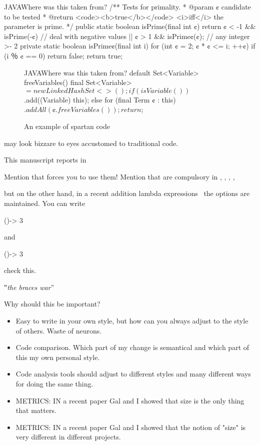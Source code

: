 \begin{Code}{JAVA}{Where was this taken from?}
/** Tests for primality.
  * @param ¢ candidate to be tested
  * @return <code><b>true</b></code> <i>iff</i> the parameter is prime. */
public static boolean isPrime(final int ¢) {
  return ¢ < -1 && isPrime(-¢) // deal with negative values
      || ¢ > 1 && isPrime¢(¢); // any integer >- 2
}
private static boolean isPrime¢(final int i) {
  for (int ¢ = 2; ¢ * ¢ <= i; ++¢)
    if (i ％ ¢ == 0)
      return false;
  return true;
}
\end{Code}
\begin{figure}[h]
  \begin{Code}{JAVA}{Where was this taken from?}
default Set<Variable> freeVariables() {
    final Set<Variable> $ = new LinkedHashSet<>();
    if (isVariable())
      $.add((Variable) this);
    else
      for (final Term ¢ : this)
        $.addAll(¢.freeVariables());
    return $;
  }
\end{Code}
\label{figure:shock-3}
\caption{An example of spartan code}
\end{figure}

may look bizzare to eyes accustomed to traditional \Java code.

This manuscript reports in

Mention that \Go forces you to use them!
Mention that are compulsory in ,
,
,
,

but on the other hand, in a recent addition lambda expressions~\cite{lambda}
the options are maintained.
You can write
\begin{JAVA}
()-> 3
\end{JAVA}
and
\begin{JAVA}
  ()-> {3}
\end{JAVA}
check this.

‟\emph{the braces war}”

Why should this be important?
\begin{itemize}
    \item Easy to write in your own style, but how can
      you always adjust to the style of others.
      Waste of neurons.
    \item Code comparison. Which part of my change is semantical and which
      part of this my own personal style.
    \item Code analysis tools should adjust to different styles and many
        different ways for doing the same thing.
    \item METRICS: IN a recent paper Gal and I showed that size
      is the only thing that matters.
    \item METRICS: IN a recent paper Gal and I showed that the notion of
      "size" is very different in different projects.
\end{itemize}

